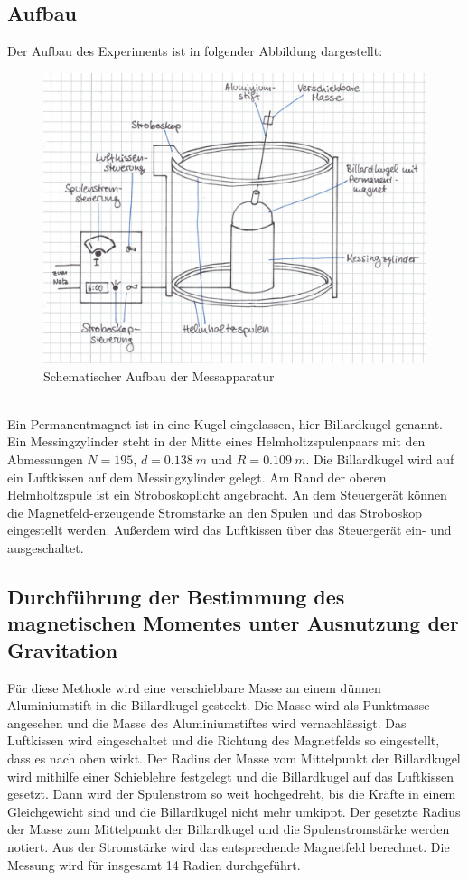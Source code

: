 \subsection{Aufbau}
Der Aufbau des Experiments ist in folgender Abbildung dargestellt:
\begin{figure}[h!]
  \centering
  \includegraphics[width=\textwidth]{Aufbau.pdf}
  \caption{Schematischer Aufbau der Messapparatur}
  \label{aufbau}
\end{figure}
\\Ein Permanentmagnet ist in eine Kugel eingelassen, hier Billardkugel genannt.
Ein Messingzylinder steht in der Mitte eines Helmholtzspulenpaars mit den Abmessungen $N=195$, $d=\SI{0.138}{m}$ und $R=\SI{0.109}{m}$.
Die Billardkugel wird auf ein Luftkissen auf dem Messingzylinder gelegt.
Am Rand der oberen Helmholtzspule ist ein Stroboskoplicht angebracht.
An dem Steuergerät können die Magnetfeld-erzeugende Stromstärke an den Spulen und das Stroboskop eingestellt werden.
Außerdem wird das Luftkissen über das Steuergerät ein- und ausgeschaltet.

\subsection{Durchführung der Bestimmung des magnetischen Momentes unter Ausnutzung der Gravitation}
Für diese Methode wird eine verschiebbare Masse an einem dünnen Aluminiumstift in die Billardkugel gesteckt.
Die Masse wird als Punktmasse angesehen und die Masse des Aluminiumstiftes wird vernachlässigt.
Das Luftkissen wird eingeschaltet und die Richtung des Magnetfelds so eingestellt, dass es nach oben wirkt.
Der Radius der Masse vom Mittelpunkt der Billardkugel wird mithilfe einer Schieblehre festgelegt und die Billardkugel auf das Luftkissen gesetzt.
Dann wird der Spulenstrom so weit hochgedreht, bis die Kräfte in einem Gleichgewicht sind und die Billardkugel nicht mehr umkippt.
Der gesetzte Radius der Masse zum Mittelpunkt der Billardkugel und die Spulenstromstärke werden notiert.
Aus der Stromstärke wird das entsprechende Magnetfeld berechnet.
Die Messung wird für insgesamt 14 Radien durchgeführt.

